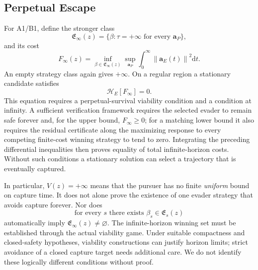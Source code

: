 \documentclass[journal,a4paper]{IEEEtran}
\newcommand{\HH}{\mathcal H}
\newcommand{\norm}[1]{\left\|#1\right\|}
\newcommand{\dd}{\mathrm d}
\begin{document}
\subsection{Perpetual Escape}
For A1/B1, define the stronger class
\begin{equation}
 \mathfrak E_\infty(z)=\{\beta:\tau=+\infty
                             \text{ for every }\mathbf a_P\},
\end{equation}
and its cost
\begin{equation}
 F_\infty(z)=\inf_{\beta\in\mathfrak E_\infty(z)}
        \sup_{\mathbf a_P}\int_0^\infty\norm{\mathbf a_E(t)}^2\dd t.
 \label{eq:Finfty}
\end{equation}
An empty strategy class again gives $+\infty$. On a regular region a stationary candidate satisfies
\begin{equation}
 \HH_E[F_\infty]=0.
 \label{eq:Fstationary}
\end{equation}
This equation requires a perpetual-survival viability condition and a condition at infinity. A sufficient verification framework requires the selected evader to remain safe forever and, for the upper bound, $F_\infty\ge0$; for a matching lower bound it also requires the residual certificate along the maximizing response to every competing finite-cost winning strategy to tend to zero. Integrating the preceding differential inequalities then proves equality of total infinite-horizon costs. Without such conditions a stationary solution can select a trajectory that is eventually captured.

In particular, $V(z)=+\infty$ means that the pursuer has no finite \emph{uniform} bound on capture time. It does not alone prove the existence of one evader strategy that avoids capture forever. Nor does
\begin{equation}
 \text{for every }s\text{ there exists }\beta_s\in\mathfrak E_s(z)
\end{equation}
automatically imply $\mathfrak E_\infty(z)\ne\varnothing$. The infinite-horizon winning set must be established through the actual viability game. Under suitable compactness and closed-safety hypotheses, viability constructions can justify horizon limits; strict avoidance of a closed capture target needs additional care. We do not identify these logically different conditions without proof.
\end{document}
